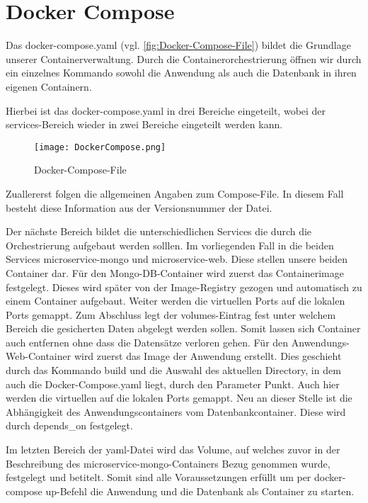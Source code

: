 
\chapter{Docker Compose}
\label{ch:Docker Compose}
Das docker-compose.yaml (vgl. \autoref{fig:Docker-Compose-File}) bildet die Grundlage unserer Containerverwaltung. Durch die Containerorchestrierung öffnen wir durch ein einzelnes Kommando sowohl die Anwendung als auch die Datenbank in ihren eigenen Containern.

Hierbei ist das \glqq docker-compose.yaml\grqq{} in drei Bereiche eingeteilt, wobei der services-Bereich wieder in zwei Bereiche eingeteilt werden kann.

\begin{wrapfigure}{r}{0\textwidth}
\centering
\texttt{[image: DockerCompose.png]}
\vspace{3pt}
\caption{Docker-Compose-File}
\label{fig:Docker-Compose-File}
\end{wrapfigure}


Zuallererst folgen die allgemeinen Angaben zum Compose-File. In diesem Fall besteht diese Information aus der Versionsnummer der Datei.

Der nächste Bereich bildet die unterschiedlichen Services die durch die Orchestrierung aufgebaut werden solllen. Im vorliegenden Fall in die beiden Services \glqq  microservice-mongo\grqq{} und \glqq  microservice-web\grqq{}. Diese stellen unsere beiden Container dar. 
Für den Mongo-DB-Container wird zuerst das Containerimage festgelegt. Dieses wird später von der Image-Registry gezogen und automatisch zu einem Container aufgebaut. Weiter werden die virtuellen Ports auf die lokalen Ports gemappt. Zum Abschluss legt der \glqq  volumes\grqq{}-Eintrag fest unter welchem Bereich die gesicherten Daten abgelegt werden sollen. Somit lassen sich Container auch entfernen ohne dass die Datensätze verloren gehen.
Für den Anwendungs-Web-Container wird zuerst das Image der Anwendung erstellt. Dies geschieht durch das Kommando \glqq  build\grqq{} und die Auswahl des aktuellen Directory, in dem auch die Docker-Compose.yaml liegt, durch den Parameter \glqq  Punkt\grqq{}. Auch hier werden die virtuellen auf die lokalen Ports gemappt. Neu an dieser Stelle ist die Abhängigkeit des Anwendungscontainers vom Datenbankcontainer. Diese wird durch \glqq  depends\_on\grqq{} festgelegt.

Im letzten Bereich der yaml-Datei wird das Volume, auf welches zuvor in der Beschreibung des \glqq  microservice-mongo\grqq{}-Containers Bezug genommen wurde, festgelegt und betitelt.
Somit sind alle Voraussetzungen erfüllt um per \glqq  docker-compose up\grqq -Befehl die Anwendung und die Datenbank als Container zu starten.

